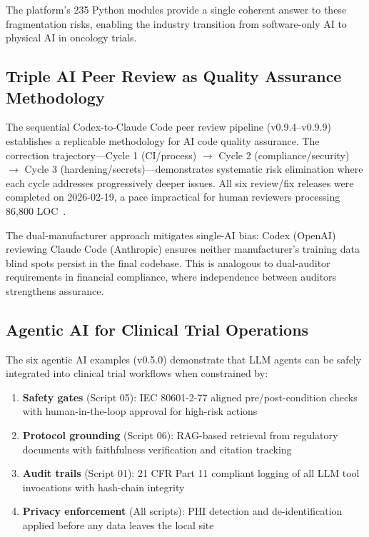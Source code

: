 \documentclass[10pt]{article}
\begin{document}
The platform's 235 Python modules provide a single coherent answer to these fragmentation risks, enabling the industry transition from software-only AI to physical AI in oncology trials.

\subsection{Triple AI Peer Review as Quality Assurance Methodology}

The sequential Codex-to-Claude Code peer review pipeline (v0.9.4--v0.9.9) establishes a replicable methodology for AI code quality assurance. The correction trajectory---Cycle 1 (CI/process) $\to$ Cycle 2 (compliance/security) $\to$ Cycle 3 (hardening/secrets)---demonstrates systematic risk elimination where each cycle addresses progressively deeper issues. All six review/fix releases were completed on 2026-02-19, a pace impractical for human reviewers processing 86,800 LOC~\cite{kawchak2026peerreview}.

The dual-manufacturer approach mitigates single-AI bias: Codex (OpenAI) reviewing Claude Code (Anthropic) ensures neither manufacturer's training data blind spots persist in the final codebase. This is analogous to dual-auditor requirements in financial compliance, where independence between auditors strengthens assurance.

\subsection{Agentic AI for Clinical Trial Operations}

The six agentic AI examples (v0.5.0) demonstrate that LLM agents can be safely integrated into clinical trial workflows when constrained by:
\begin{enumerate}
  \item \textbf{Safety gates} (Script 05): IEC 80601-2-77 aligned pre/post-condition checks with human-in-the-loop approval for high-risk actions~\cite{iec80601}
  \item \textbf{Protocol grounding} (Script 06): RAG-based retrieval from regulatory documents with faithfulness verification and citation tracking
  \item \textbf{Audit trails} (Script 01): 21 CFR Part 11 compliant logging of all LLM tool invocations with hash-chain integrity~\cite{cfr_part11}
  \item \textbf{Privacy enforcement} (All scripts): PHI detection and de-identification applied before any data leaves the local site
\end{enumerate}
\end{document}
